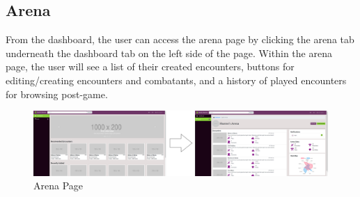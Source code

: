 \documentclass[12pt,a4paper]{report}
\begin{document}
		\subsection{Arena}
		From the dashboard, the user can access the arena page by clicking the arena tab underneath the dashboard tab on the left side of the page. Within the arena page, the user will see a list of their created encounters, buttons for editing/creating encounters and combatants, and a history of played encounters for browsing post-game.
		\begin{figure}[H]
			\centering
			\centerline{\includegraphics[scale=.16]{arenaNav}}
			\caption{Arena Page}
			\label{fig: Dashboard to Arena}
		\end{figure}
		\newpage
\end{document}

